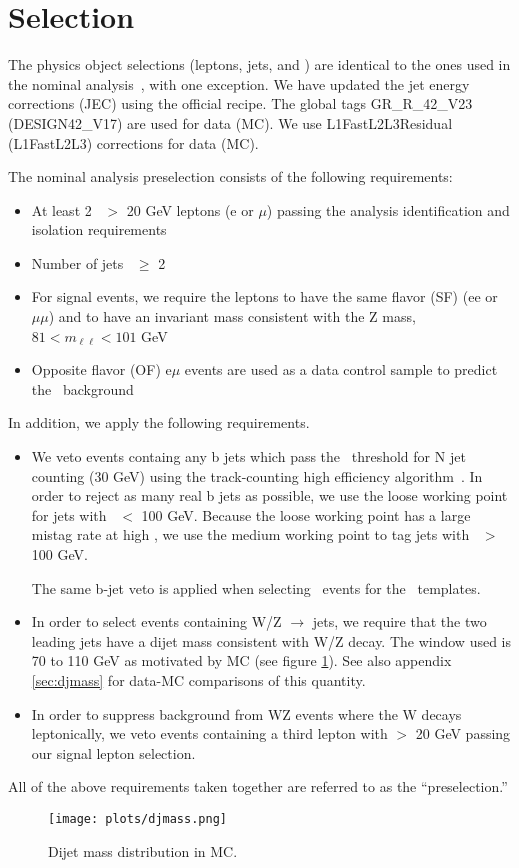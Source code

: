 
\section{Selection}
\label{sec:eventSelection}

The physics object  selections (leptons, jets, and \MET) are identical to the ones
used in the nominal analysis~\cite{ref:osznote}, with one exception.
We have updated the jet energy corrections (JEC) using the official recipe.
The global tags GR\_R\_42\_V23 (DESIGN42\_V17) are used for data (MC).
We use L1FastL2L3Residual (L1FastL2L3) corrections for data (MC).

The nominal analysis preselection \cite{ref:osznote} consists of the following requirements:

\begin{itemize}
\item At least 2 \pt\ $>$ 20 GeV leptons (e or $\mu$) passing the analysis identification and isolation requirements
\item Number of jets \njets\ $\geq$ 2
\item For signal events, we require the leptons to have the same flavor (SF) (ee or $\mu\mu$) and to have an invariant
mass consistent with the Z mass, $81 < m_{\ell\ell} < 101$ GeV
\item Opposite flavor (OF) e$\mu$ events are used as a data control sample to predict the \ttbar\ background
\end{itemize}

In addition, we apply the following requirements.

\begin{itemize}
  \item We veto events containg any b jets which pass the \pt\ threshold for N jet counting (30 GeV) using the track-counting high efficiency algorithm~\cite{BTV11003}.
	In order to reject as many real b jets as possible, we use the loose working point for jets with \pt\ $<$ 100 GeV. 
	Because the loose working point has a large mistag rate at high \pt,
	we use the medium working point to tag jets with \pt\ $>$ 100 GeV.

        The same b-jet veto is applied when selecting \gjets\ events for the \MET\ templates.

  \item In order to select events containing W/Z $\rightarrow$ jets, 
	we require that the two leading jets have a dijet mass consistent
	with W/Z decay. The window used is 70 to 110 GeV as motivated
	by MC (see figure \ref{fig:djmass}). See also appendix 
	\ref{sec:djmass} for data-MC comparisons of this quantity.

  \item In order to suppress background from WZ events where the W decays
	leptonically, we veto events containing a third lepton with \pt $>$ 20 GeV passing
	our signal lepton selection.
\end{itemize}

All of the above requirements taken together are referred to as the ``preselection.''


\begin{figure}[tbh]
  \begin{center}
	\texttt{[image: plots/djmass.png]}
	\caption{ \label{fig:djmass}\protect 
	  Dijet mass distribution in MC.
	}
  \end{center}
\end{figure}
